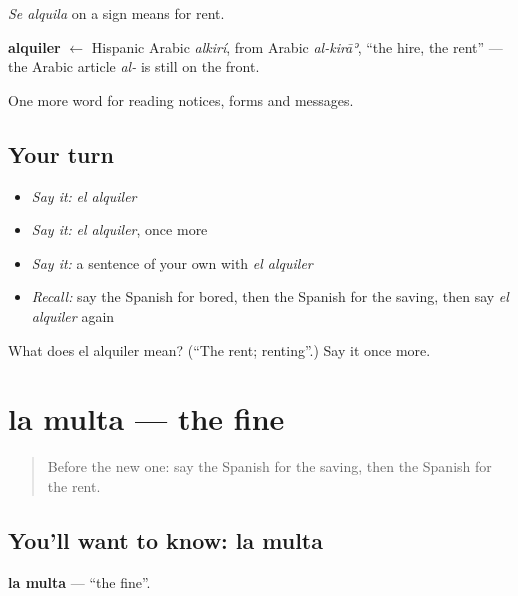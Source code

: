 \emph{Se alquila} on a sign means for rent.

\begin{cousinweb}
\textbf{alquiler} $\leftarrow$ Hispanic Arabic \emph{alkirí}, from Arabic \emph{al-kirāʾ}, \textquotedblleft{}the hire, the rent\textquotedblright{} — the Arabic article \emph{al-} is still on the front.
\end{cousinweb}

\begin{grammarlens}[title={What you've built}]
One more word for reading notices, forms and messages.
\end{grammarlens}

\subsection*{Your turn}
\begin{itemize}
\raggedright
  \item \emph{Say it:} \emph{el alquiler}
  \item \emph{Say it:} \emph{el alquiler}, once more
  \item \emph{Say it:} a sentence of your own with \emph{el alquiler}
  \item \emph{Recall:} say the Spanish for bored, then the Spanish for the saving, then say \emph{el alquiler} again
\end{itemize}

\begin{tcolorbox}[breakable,colback=teal!4,colframe=teal!35!black,title={Before you move on}]
What does el alquiler mean? (\textquotedblleft{}The rent; renting\textquotedblright{}.) Say it once more.
\end{tcolorbox}
\section[la multa]{la multa — the fine}

\label{lesson:ES-C477-multa}



\begin{quote}
Before the new one: say the Spanish for the saving, then the Spanish for the rent.
\end{quote}

\subsection*{You'll want to know: la multa}
\textbf{la multa} — \textquotedblleft{}the fine\textquotedblright{}.

